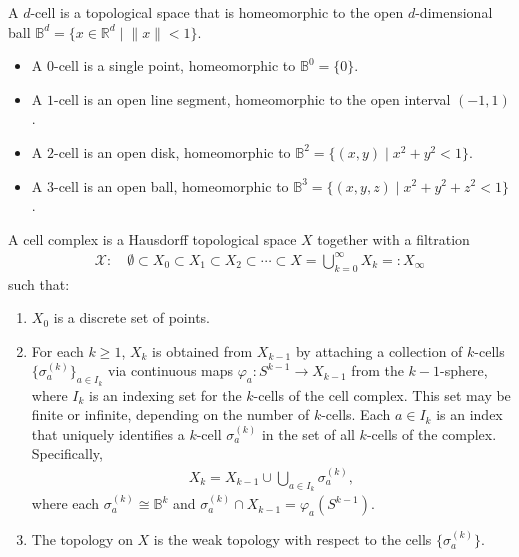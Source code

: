\begin{definition}[\(d\)-cell]
A \(d\)-cell is a topological space that is homeomorphic to the open \(d\)-dimensional ball $\mathbb{B}^d = \{ x \in \mathbb{R}^d \; \vert \; \|x\| < 1 \}$.
\end{definition}

\begin{example}\noindent
\begin{itemize}
    \item A $0$-cell is a single point, homeomorphic to \(\mathbb{B}^0 = \{ 0 \}\).
    \item A $1$-cell is an open line segment, homeomorphic to the open interval \((-1, 1)\).
    \item A $2$-cell is an open disk, homeomorphic to \(\mathbb{B}^2 = \{ (x, y) \; \vert \; x^2 + y^2 < 1 \}\).
    \item A $3$-cell is an open ball, homeomorphic to \(\mathbb{B}^3 = \{ (x, y, z) \; \vert \; x^2 + y^2 + z^2 < 1 \}\).
\end{itemize}
\end{example}

\begin{definition}
A cell complex is a Hausdorff topological space \(X\) together with a filtration
\begin{align}
\mathcal{X}: \quad \emptyset \subset X_0 \subset X_1 \subset X_2 \subset \cdots \subset X = \bigcup_{k=0}^{\infty} X_k =: X_\infty
\end{align}
such that:
\begin{enumerate}
    \item \(X_0\) is a discrete set of points.
    \item For each \(k \geq 1\), \(X_k\) is obtained from \(X_{k-1}\) by attaching a collection of \(k\)-cells \(\{\sigma^{(k)}_a\}_{a \in I_k}\) via continuous maps \(\varphi_a : S^{k-1} \to X_{k-1}\) from the $k-1$-sphere, where \(I_k\) is an indexing set for the \(k\)-cells of the cell complex. This set may be finite or infinite, depending on the number of \(k\)-cells. Each \(a \in I_k\) is an index that uniquely identifies a \(k\)-cell \(\sigma^{(k)}_a\) in the set of all \(k\)-cells of the complex. Specifically,
\begin{align}
    X_k = X_{k-1} \cup \bigcup_{a \in I_k} \sigma^{(k)}_a,
\end{align}
    where each \(\sigma^{(k)}_a \cong \mathbb{B}^k\) and \(\sigma^{(k)}_a \cap X_{k-1} = \varphi_a(S^{k-1})\).
    \item The topology on \(X\) is the weak topology with respect to the cells \(\{\sigma^{(k)}_a\}\).
\end{enumerate}
\end{definition}

